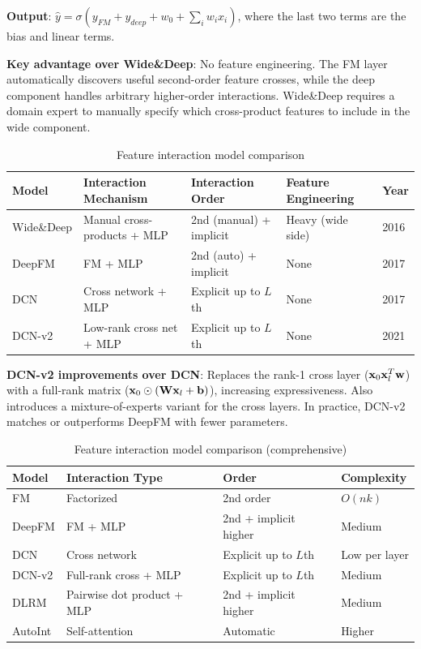 \textbf{Output}: $\hat{y} = \sigma(y_{FM} + y_{deep} + w_0 + \sum_i w_i x_i)$, where the last two terms are the bias and linear terms.

\textbf{Key advantage over Wide\&Deep}: No feature engineering. The FM layer automatically discovers useful second-order feature crosses, while the deep component handles arbitrary higher-order interactions. Wide\&Deep requires a domain expert to manually specify which cross-product features to include in the wide component.

\begin{table}[H]
\centering
\caption{Feature interaction model comparison}
\begin{tabularx}{\textwidth}{lXXXl}
\toprule
\textbf{Model} & \textbf{Interaction Mechanism} & \textbf{Interaction Order} & \textbf{Feature Engineering} & \textbf{Year} \\
\midrule
Wide\&Deep & Manual cross-products + MLP & 2nd (manual) + implicit & Heavy (wide side) & 2016 \\
DeepFM & FM + MLP & 2nd (auto) + implicit & None & 2017 \\
DCN & Cross network + MLP & Explicit up to $L$th & None & 2017 \\
DCN-v2 & Low-rank cross net + MLP & Explicit up to $L$th & None & 2021 \\
\bottomrule
\end{tabularx}
\end{table}

\textbf{DCN-v2 improvements over DCN}: Replaces the rank-1 cross layer ($\mathbf{x}_0 \mathbf{x}_l^T \mathbf{w}$) with a full-rank matrix ($\mathbf{x}_0 \odot (\mathbf{W} \mathbf{x}_l + \mathbf{b})$), increasing expressiveness. Also introduces a mixture-of-experts variant for the cross layers. In practice, DCN-v2 matches or outperforms DeepFM with fewer parameters.

\begin{table}[H]
\centering
\caption{Feature interaction model comparison (comprehensive)}
\begin{tabularx}{\textwidth}{lXXX}
\toprule
\textbf{Model} & \textbf{Interaction Type} & \textbf{Order} & \textbf{Complexity} \\
\midrule
FM & Factorized & 2nd order & $O(nk)$ \\
DeepFM & FM + MLP & 2nd + implicit higher & Medium \\
DCN & Cross network & Explicit up to $L$th & Low per layer \\
DCN-v2 & Full-rank cross + MLP & Explicit up to $L$th & Medium \\
DLRM & Pairwise dot product + MLP & 2nd + implicit higher & Medium \\
AutoInt & Self-attention & Automatic & Higher \\
\bottomrule
\end{tabularx}
\end{table}

